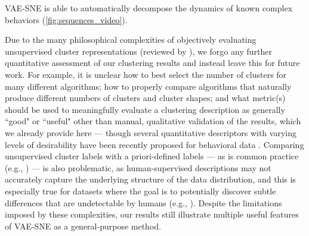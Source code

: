 \documentclass[11pt,a4paper,oneside]{book}
\begin{document}
\begin{doublespace}
VAE-SNE is able to automatically decompose the dynamics of known complex behaviors (\ref{fig:sequences_video}).

Due to the many philosophical complexities of objectively evaluating unsupervised cluster representations (reviewed by \citealt{jain1999data, kleinberg2003impossibility, todd2017systematic}), we forgo any further quantitative assessment of our clustering results and instead leave this for future work. For example, it is unclear how to best select the number of clusters for many different algorithms; how to properly compare algorithms that naturally produce different numbers of clusters and cluster shapes; and what metric(s) should be used to meaningfully evaluate a clustering description as generally ``good" or ``useful" other than manual, qualitative validation of the results, which we already provide here --- though several quantitative descriptors with varying levels of desirability have been recently proposed for behavioral data \citep{todd2017systematic}. Comparing unsupervised cluster labels with a priori-defined labels --- as is common practice (e.g., \citealt{jiang2016variational, xie2016unsupervised, guo2017improved, yang2019deep, luxem2020identifying}) --- is also problematic, as human-supervised descriptions may not accurately capture the underlying structure of the data distribution, and this is especially true for datasets where the goal is to potentially discover subtle differences that are undetectable by humans (e.g., \citealt{wiltschko2015mapping}). Despite the limitations imposed by these complexities, our results still illustrate multiple useful features of VAE-SNE as a general-purpose method.


\end{doublespace}
\end{document}
